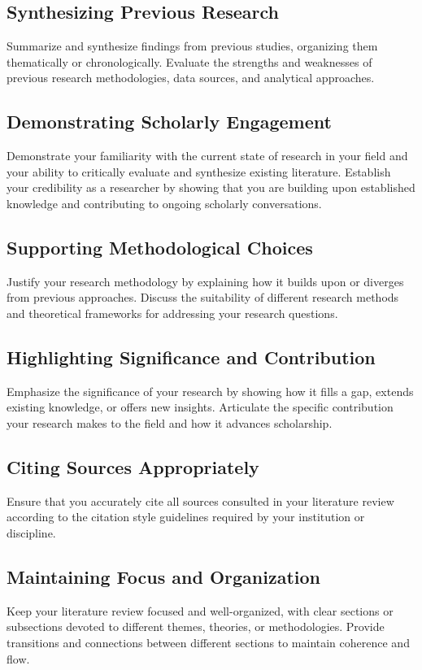 \subsection{Synthesizing Previous Research}
Summarize and synthesize findings from previous studies, organizing them thematically or chronologically.
Evaluate the strengths and weaknesses of previous research methodologies, data sources, and analytical approaches.
    
\subsection{Demonstrating Scholarly Engagement}
Demonstrate your familiarity with the current state of research in your field and your ability to critically evaluate and synthesize existing literature.
Establish your credibility as a researcher by showing that you are building upon established knowledge and contributing to ongoing scholarly conversations.
    
\subsection{Supporting Methodological Choices}
Justify your research methodology by explaining how it builds upon or diverges from previous approaches.
Discuss the suitability of different research methods and theoretical frameworks for addressing your research questions.
    
\subsection{Highlighting Significance and Contribution}
Emphasize the significance of your research by showing how it fills a gap, extends existing knowledge, or offers new insights.
Articulate the specific contribution your research makes to the field and how it advances scholarship.
    
\subsection{Citing Sources Appropriately}
Ensure that you accurately cite all sources consulted in your literature review according to the citation style guidelines required by your institution or discipline.

\subsection{Maintaining Focus and Organization}
Keep your literature review focused and well-organized, with clear sections or subsections devoted to different themes, theories, or methodologies.
Provide transitions and connections between different sections to maintain coherence and flow.


